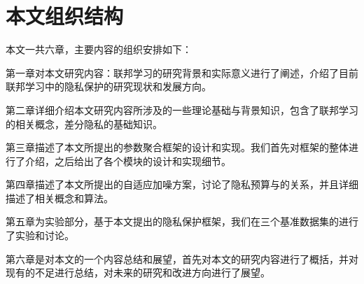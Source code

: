 \section{本文组织结构}

本文一共六章，主要内容的组织安排如下：

第一章对本文研究内容：联邦学习的研究背景和实际意义进行了阐述，介绍了目前联邦学习中的隐私保护的研究现状和发展方向。

第二章详细介绍本文研究内容所涉及的一些理论基础与背景知识，包含了联邦学习的相关概念，差分隐私的基础知识。

第三章描述了本文所提出的参数聚合框架的设计和实现。我们首先对框架的整体进行了介绍，之后给出了各个模块的设计和实现细节。
  
第四章描述了本文所提出的自适应加噪方案，讨论了隐私预算与的关系，并且详细描述了相关概念和算法。
    
第五章为实验部分，基于本文提出的隐私保护框架，我们在三个基准数据集的进行了实验和讨论。

第六章是对本文的一个内容总结和展望，首先对本文的研究内容进行了概括，并对现有的不足进行总结，对未来的研究和改进方向进行了展望。



